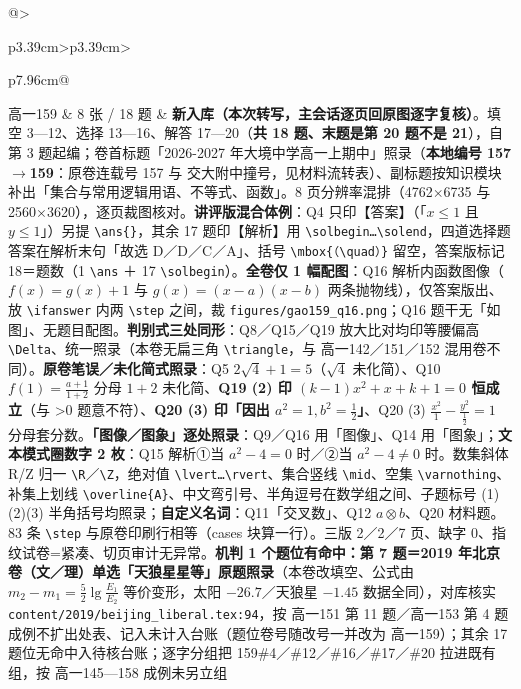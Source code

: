 \documentclass[a4paper,11pt]{article}
\begin{document}
\begin{xltabular}{\textwidth}{@{}>{\raggedright\arraybackslash}p{3.39cm}>{\centering\arraybackslash}p{3.39cm}>{\raggedright\arraybackslash}p{7.96cm}@{}}
高一159 & 8 张 / 18 题 & \textbf{新入库（本次转写，主会话逐页回原图逐字复核）}。填空 3---12、选择 13---16、解答 17---20（\textbf{共 18 题、末题是第 20 题不是 21}），自第 3 题起编；卷首标题「2026-2027 年大境中学高一上期中」照录（\textbf{本地编号 157$\to$159}：原卷连载号 157 与 交大附中撞号，见材料流转表）、副标题按知识模块补出「集合与常用逻辑用语、不等式、函数」。8 页分辨率混排（4762$\times$6735 与 2560$\times$3620），逐页裁图核对。\textbf{讲评版混合体例}：Q4 只印【答案】（「\(x\leqslant\allowbreak 1\) 且 \(y\leqslant\allowbreak 1\)」）另提 \texttt{\textbackslash{}ans\{\}}，其余 17 题印【解析】用 \texttt{\textbackslash{}solbegin…\textbackslash{}solend}，四道选择题答案在解析末句「故选 D／D／C／A」、括号 \texttt{\textbackslash{}mbox\{（\textbackslash{}quad）\}} 留空，答案版标记 18＝题数（1 \texttt{\textbackslash{}ans} ＋ 17 \texttt{\textbackslash{}solbegin}）。\textbf{全卷仅 1 幅配图}：Q16 解析内函数图像（\(f(x)=g(x)+\allowbreak 1\) 与 \(g(x)=\allowbreak (x-a)(x-b)\) 两条抛物线），仅答案版出、放 \texttt{\textbackslash{}ifanswer} 内两 \texttt{\textbackslash{}step} 之间，裁 \texttt{figures/\allowbreak{}gao159\_q16.png}；Q16 题干无「如图」、无题目配图。\textbf{判别式三处同形}：Q8／Q15／Q19 放大比对均印等腰偏高 \texttt{\textbackslash{}Delta}、统一照录（本卷无扁三角 \texttt{\textbackslash{}triangle}，与 高一142／151／152 混用卷不同）。\textbf{原卷笔误／未化简式照录}：Q5 \(2\sqrt4+\allowbreak 1=\allowbreak 5\)（\(\sqrt4\) 未化简）、Q10 \(f(1)=\allowbreak \frac{a+\allowbreak 1}{1+\allowbreak 2}\) 分母 \(1+\allowbreak 2\) 未化简、\textbf{Q19 (2) 印 \((k-1)x^2+x+k+\allowbreak 1=\allowbreak 0\) 恒成立}（与 \textgreater0 题意不符）、\textbf{Q20 (3) 印「因出 \(a^2=\allowbreak 1,\allowbreak  b^2=\allowbreak \frac12\)」}、Q20 (3) \(\frac{x^2}{1}-\frac{y^2}{\frac12}=\allowbreak 1\) 分母套分数。\textbf{「图像／图象」逐处照录}：Q9／Q16 用「图像」、Q14 用「图象」；\textbf{文本模式圈数字 2 枚}：Q15 解析①当 \(a^2-4=\allowbreak 0\) 时／②当 \(a^2-4\ne0\) 时。数集斜体 R/Z 归一 \texttt{\textbackslash{}R}／\texttt{\textbackslash{}Z}，绝对值 \texttt{\textbackslash{}lvert…\textbackslash{}rvert}、集合竖线 \texttt{\textbackslash{}mid}、空集 \texttt{\textbackslash{}varnothing}、补集上划线 \texttt{\textbackslash{}overline\{A\}}、中文弯引号、半角逗号在数学组之间、子题标号 (1)(2)(3) 半角括号均照录；\textbf{自定义名词}：Q11「交叉数」、Q12 \(a\otimes b\)、Q20 材料题。83 条 \texttt{\textbackslash{}step} 与原卷印刷行相等（cases 块算一行）。三版 2／2／7 页、缺字 0、指纹试卷=紧凑、切页审计无异常。\textbf{机判 1 个题位有命中：第 7 题＝2019 年北京卷（文／理）单选「天狼星星等」原题照录}（本卷改填空、公式由 \(m_2-m_1=\allowbreak \frac52\lg\frac{E_1}{E_2}\) 等价变形，太阳 \(-26.7\)／天狼星 \(-1.45\) 数据全同），对库核实 \texttt{content/\allowbreak{}2019/\allowbreak{}beijing\_liberal.tex:94}，按 高一151 第 11 题／高一153 第 4 题成例不扩出处表、记入未计入台账（题位卷号随改号一并改为 高一159）；其余 17 题位无命中入待核台账；逐字分组把 159\#4／\#12／\#16／\#17／\#20 拉进既有组，按 高一145---158 成例未另立组 \\ \addlinespace[1pt]

\end{xltabular}
\end{document}
